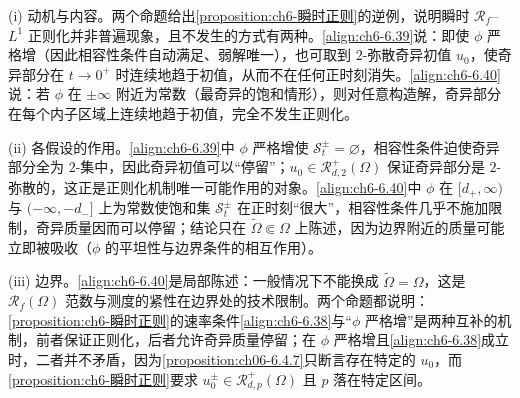 \documentclass[../../main.tex]{subfiles}%
\begin{document}
\begin{remark}\label{remark:ch06-非正则动机}
(i) 动机与内容。两个命题给出\cref{proposition:ch6-瞬时正则}的逆例，说明瞬时 $\mathscr{R}_f$--$L^1$ 正则化并非普遍现象，且不发生的方式有两种。\eqref{align:ch6-6.39}说：即使 $\phi$ 严格增（因此相容性条件自动满足、弱解唯一），也可取到 $2$-弥散奇异初值 $u_0$，使奇异部分在 $t\to0^+$ 时连续地趋于初值，从而不在任何正时刻消失。\eqref{align:ch6-6.40}说：若 $\phi$ 在 $\pm\infty$ 附近为常数（最奇异的饱和情形），则对任意构造解，奇异部分在每个内子区域上连续地趋于初值，完全不发生正则化。

(ii) 各假设的作用。\eqref{align:ch6-6.39}中 $\phi$ 严格增使 $\mathscr{S}^\pm_t=\varnothing$，相容性条件迫使奇异部分全为 $2$-集中，因此奇异初值可以“停留”；$u_0\in\mathscr{R}^+_{d,2}(\Omega)$ 保证奇异部分是 $2$-弥散的，这正是正则化机制唯一可能作用的对象。\eqref{align:ch6-6.40}中 $\phi$ 在 $[d_+,\infty)$ 与 $(-\infty,-d_-]$ 上为常数使饱和集 $\mathscr{S}^\pm_t$ 在正时刻“很大”，相容性条件几乎不施加限制，奇异质量因而可以停留；结论只在 $\widetilde\Omega\Subset\Omega$ 上陈述，因为边界附近的质量可能立即被吸收（$\phi$ 的平坦性与边界条件的相互作用）。

(iii) 边界。\eqref{align:ch6-6.40}是局部陈述：一般情况下不能换成 $\widetilde\Omega=\Omega$，这是 $\mathscr{R}_f(\Omega)$ 范数与测度的紧性在边界处的技术限制。两个命题都说明：\cref{proposition:ch6-瞬时正则}的速率条件\eqref{align:ch6-6.38}与“$\phi$ 严格增”是两种互补的机制，前者保证正则化，后者允许奇异质量停留；在 $\phi$ 严格增且\eqref{align:ch6-6.38}成立时，二者并不矛盾，因为\cref{proposition:ch06-6.4.7}只断言存在特定的 $u_0$，而\cref{proposition:ch6-瞬时正则}要求 $u^\pm_0\in\mathscr{R}^+_{d,p}(\Omega)$ 且 $p$ 落在特定区间。
\end{remark}
\end{document}
